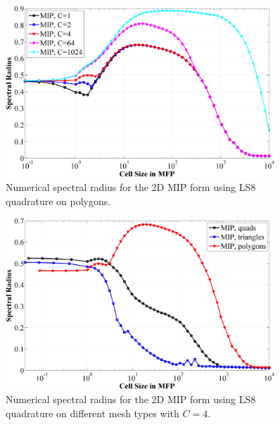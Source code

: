 \begin{figure}
\label{fig::2D_NSR_MIP_polygons}
\centering
\includegraphics[width=0.9\textwidth]{figures/appendices/MIP_V_poly2D_LS8_C=1,2,4,64,1024.png}
\caption{Numerical spectral radius for the 2D MIP form using LS8 quadrature on polygons.}
\end{figure}

\begin{figure}
\label{fig::2D_NSR_MIP_q,t,p}
\centering
\includegraphics[width=0.9\textwidth]{figures/appendices/MIP_V_quad,tri,poly_LS8_C=4.png}
\caption{Numerical spectral radius for the 2D MIP form using LS8 quadrature on different mesh types with $C=4$.}
\end{figure}


